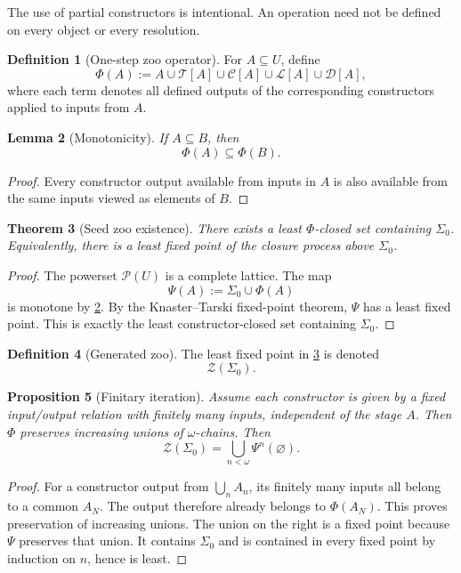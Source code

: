 \documentclass[11pt]{article}
\newtheorem{theorem}{Theorem}[section]
\newtheorem{proposition}[theorem]{Proposition}
\newtheorem{lemma}[theorem]{Lemma}
\theoremstyle{definition}
\newtheorem{definition}[theorem]{Definition}
\theoremstyle{remark}
\newcommand{\Zoo}{\mathcal Z}
\newcommand{\Seeds}{\Sigma}
\begin{document}
The use of partial constructors is intentional. An operation need not be defined on every object or every resolution.

\begin{definition}[One-step zoo operator]
For $A\subseteq U$, define
\[
\Phi(A):=
A
\cup \mathscr T[A]
\cup \mathscr C[A]
\cup \mathscr L[A]
\cup \mathscr D[A],
\]
where each term denotes all defined outputs of the corresponding constructors applied to inputs from $A$.
\end{definition}

\begin{lemma}[Monotonicity]\label{lem:phi-monotone}
If $A\subseteq B$, then
\[
\Phi(A)\subseteq\Phi(B).
\]
\end{lemma}

\begin{proof}
Every constructor output available from inputs in $A$ is also available from the same inputs viewed as elements of $B$.
\end{proof}

\begin{theorem}[Seed zoo existence]\label{thm:zoo-existence}
There exists a least $\Phi$-closed set containing $\Seeds_0$. Equivalently, there is a least fixed point of the closure process above $\Seeds_0$.
\end{theorem}

\begin{proof}
The powerset $\mathcal P(U)$ is a complete lattice. The map
\[
\Psi(A):=\Seeds_0\cup\Phi(A)
\]
is monotone by \cref{lem:phi-monotone}. By the Knaster--Tarski fixed-point theorem, $\Psi$ has a least fixed point. This is exactly the least constructor-closed set containing $\Seeds_0$.
\end{proof}

\begin{definition}[Generated zoo]
The least fixed point in \cref{thm:zoo-existence} is denoted
\[
\Zoo(\Seeds_0).
\]
\end{definition}

\begin{proposition}[Finitary iteration]\label{prop:finitary}
Assume each constructor is given by a fixed input/output relation with finitely many inputs, independent of the stage $A$. Then $\Phi$ preserves increasing unions of $\omega$-chains. Then
\[
\Zoo(\Seeds_0)
=
\bigcup_{n<\omega}\Psi^n(\varnothing).
\]
\end{proposition}

\begin{proof}
For a constructor output from $\bigcup_n A_n$, its finitely many inputs all belong to a common $A_N$. The output therefore already belongs to $\Phi(A_N)$. This proves preservation of increasing unions. The union on the right is a fixed point because $\Psi$ preserves that union. It contains $\Seeds_0$ and is contained in every fixed point by induction on $n$, hence is least.
\end{proof}
\end{document}

